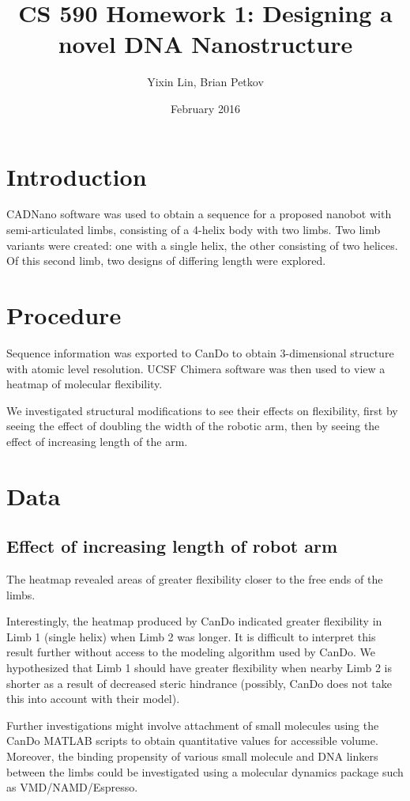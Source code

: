 \documentclass{article}
\title{CS 590 Homework 1: Designing a novel DNA Nanostructure}
\author{Yixin Lin, Brian Petkov }
\date{February 2016}
\begin{document}
\maketitle

\section{Introduction}

CADNano software was used to obtain a sequence for a proposed nanobot with semi-articulated limbs, consisting of a 4-helix body with two limbs. Two limb variants were created: one with a single helix, the other consisting of two helices. Of this second limb, two designs of differing length were explored.

\section{Procedure}

Sequence information was exported to CanDo to obtain 3-dimensional structure with atomic level resolution. UCSF Chimera software was then used to view a heatmap of molecular flexibility.

We investigated structural modifications to see their effects on flexibility, first by seeing the effect of doubling the width of the robotic arm, then by seeing the effect of increasing length of the arm.

\section{Data}


\subsection{Effect of increasing length of robot arm}
\textit{}
The heatmap revealed areas of greater flexibility closer to the free ends of the limbs.

Interestingly, the heatmap produced by CanDo indicated greater flexibility in Limb 1 (single helix) when Limb 2 was longer. It is difficult to interpret this result further without access to the modeling algorithm used by CanDo. We hypothesized that Limb 1 should have greater flexibility when nearby Limb 2 is shorter as a result of decreased steric hindrance (possibly, CanDo does not take this into account with their model).

Further investigations might involve attachment of small molecules using the CanDo MATLAB scripts to obtain quantitative values for accessible volume. Moreover, the binding propensity of various small molecule and DNA linkers between the limbs could be investigated using a molecular dynamics package such as VMD/NAMD/Espresso.
\end{document}
